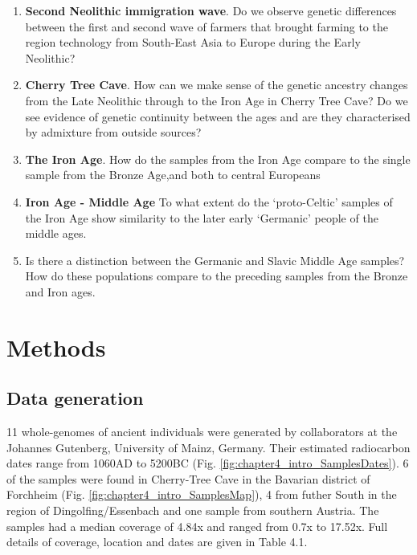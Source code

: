\begin{enumerate}
\item \textbf{Second Neolithic immigration wave}. Do we observe genetic differences between the first and second wave of farmers that brought farming to the region technology from South-East Asia to Europe during the Early Neolithic?
\item \textbf{Cherry Tree Cave}. How can we make sense of the genetic ancestry changes from the Late Neolithic through to the Iron Age in Cherry Tree Cave? Do we see evidence of genetic continuity between the ages and are they characterised by admixture from outside sources?
\item \textbf{The Iron Age}. How do the samples from the Iron Age compare to the single sample from the Bronze Age,and both to central Europeans
\item \textbf{Iron Age - Middle Age} To what extent do the `proto-Celtic' samples of the Iron Age show similarity to the later early `Germanic' people of the middle ages.  
\item Is there a distinction between the Germanic and Slavic Middle Age samples? How do these populations compare to the preceding samples from the Bronze and Iron ages. 
\end{enumerate}

\section{Methods}

\subsection{Data generation}

11 whole-genomes of ancient individuals were generated by collaborators at the Johannes Gutenberg, University of Mainz, Germany. Their estimated radiocarbon dates range from 1060AD to 5200BC (Fig. \ref{fig:chapter4_intro_SamplesDates}). 6 of the samples were found in Cherry-Tree Cave in the Bavarian district of Forchheim (Fig. \ref{fig:chapter4_intro_SamplesMap}), 4 from futher South in the region of Dingolfing/Essenbach and one sample from southern Austria. The samples had a median coverage of 4.84x and ranged from 0.7x to 17.52x. Full details of coverage, location and dates are given in Table 4.1.

